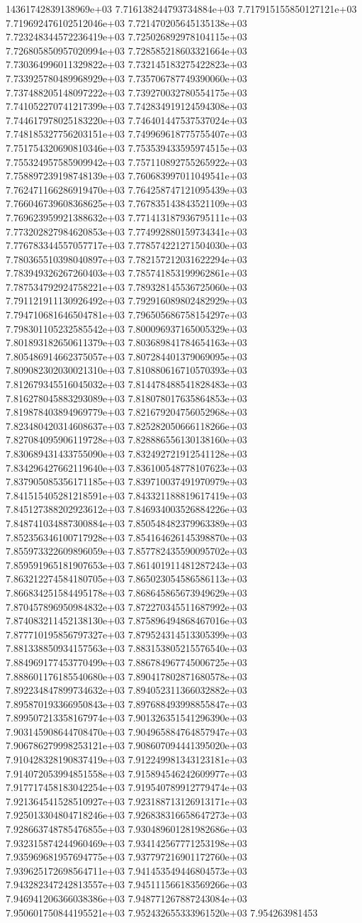 14361742839138969e+03	7.716138244793734884e+03	7.717915155850127121e+03	7.719692476102512046e+03	7.721470205645135138e+03	7.723248344572236419e+03	7.725026892978104115e+03	7.726805850957020994e+03	7.728585218603321664e+03	7.730364996011329822e+03	7.732145183275422823e+03	7.733925780489968929e+03	7.735706787749390060e+03	7.737488205148097222e+03	7.739270032780554175e+03	7.741052270741217399e+03	7.742834919124594308e+03	7.744617978025183220e+03	7.746401447537537024e+03	7.748185327756203151e+03	7.749969618775755407e+03	7.751754320690810346e+03	7.753539433595974515e+03	7.755324957585909942e+03	7.757110892755265922e+03	7.758897239198748139e+03	7.760683997011049541e+03	7.762471166286919470e+03	7.764258747121095439e+03	7.766046739608368625e+03	7.767835143843521109e+03	7.769623959921388632e+03	7.771413187936795111e+03	7.773202827984620853e+03	7.774992880159734341e+03	7.776783344557057717e+03	7.778574221271504030e+03	7.780365510398040897e+03	7.782157212031622294e+03	7.783949326267260403e+03	7.785741853199962861e+03	7.787534792924758221e+03	7.789328145536725060e+03	7.791121911130926492e+03	7.792916089802482929e+03	7.794710681646504781e+03	7.796505686758154297e+03	7.798301105232585542e+03	7.800096937165005329e+03	7.801893182650611379e+03	7.803689841784654163e+03	7.805486914662375057e+03	7.807284401379069095e+03	7.809082302030021310e+03	7.810880616710570393e+03	7.812679345516045032e+03	7.814478488541828483e+03	7.816278045883293089e+03	7.818078017635864853e+03	7.819878403894969779e+03	7.821679204756052968e+03	7.823480420314608637e+03	7.825282050666118266e+03	7.827084095906119728e+03	7.828886556130138160e+03	7.830689431433755090e+03	7.832492721912541128e+03	7.834296427662119640e+03	7.836100548778107623e+03	7.837905085356171185e+03	7.839710037491970979e+03	7.841515405281218591e+03	7.843321188819617419e+03	7.845127388202923612e+03	7.846934003526884226e+03	7.848741034887300884e+03	7.850548482379963389e+03	7.852356346100717928e+03	7.854164626145398870e+03	7.855973322609896059e+03	7.857782435590095702e+03	7.859591965181907653e+03	7.861401911481287243e+03	7.863212274584180705e+03	7.865023054586586113e+03	7.866834251584495178e+03	7.868645865673949629e+03	7.870457896950984832e+03	7.872270345511687992e+03	7.874083211452138130e+03	7.875896494868467016e+03	7.877710195856797327e+03	7.879524314513305399e+03	7.881338850934157563e+03	7.883153805215576540e+03	7.884969177453770499e+03	7.886784967745006725e+03	7.888601176185540680e+03	7.890417802871680578e+03	7.892234847899734632e+03	7.894052311366032882e+03	7.895870193366950843e+03	7.897688493998855847e+03	7.899507213358167974e+03	7.901326351541296390e+03	7.903145908644708470e+03	7.904965884764857947e+03	7.906786279998253121e+03	7.908607094441395020e+03	7.910428328190837419e+03	7.912249981343123181e+03	7.914072053994851558e+03	7.915894546242609977e+03	7.917717458183042254e+03	7.919540789912779474e+03	7.921364541528510927e+03	7.923188713126913171e+03	7.925013304804718246e+03	7.926838316658647273e+03	7.928663748785476855e+03	7.930489601281982686e+03	7.932315874244960469e+03	7.934142567771253198e+03	7.935969681957694775e+03	7.937797216901172760e+03	7.939625172698564711e+03	7.941453549446804573e+03	7.943282347242813557e+03	7.945111566183569266e+03	7.946941206366038386e+03	7.948771267887243084e+03	7.950601750844195521e+03	7.952432655333961520e+03	7.954263981453